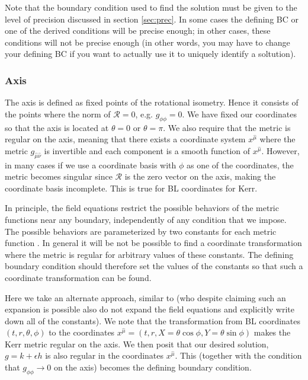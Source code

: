 \documentclass[aps,prd,amsmath,showpacs,amssymb,superscriptaddress,nofootinbib,longbibliography,eqsecnum,preprintnumbers]{revtex4-1}
\begin{document}
Note that the boundary condition used to find the solution must be given to the level of precision discussed in section \ref{sec:prec}. In some cases the defining BC or one of the derived conditions will be precise enough; in other cases, these conditions will not be precise enough (in other words, you may have to change your defining BC if you want to actually use it to uniquely identify a soltution).


\subsubsection{Axis}

The axis is defined as fixed points of the rotational isometry. Hence it consists of the points where the norm of $\mathcal{R}=0$, e.g. $g_{\phi\phi}=0$. We have fixed our coordinates so that the axis is located at $\theta =0$ or $\theta =\pi$. We also require that the metric is regular on the axis, meaning that there exists a coordinate system $x^{\hat \mu}$ where the metric $g_{\hat \mu \hat \nu}$ is invertible and each component is a smooth function of $x^{\hat \mu}$.  However, in many cases if we use a coordinate basis with $\phi$ as one of the coordinates, the metric becomes singular since $\mathcal{R}$ is the zero vector on the axis, making the coordinate basis incomplete. This is true for BL coordinates for Kerr. 

In principle, the field equations restrict the possible behaviors of the metric functions near any boundary, independently of any condition that we impose. The possible behaviors are parameterized by two constants for each metric function \cite{Dias:2015nua}. In general it will be not be possible to find a coordinate transformation where the metric is regular for arbitrary values of these constants. The defining boundary condition should therefore set the values of the constants so that such a coordinate transformation can be found.

Here we take an alternate approach, similar to \cite{Dias:2015nua} (who despite claiming such an expansion is possible also do not expand the field equations and explicitly write down all of the constants). We note that the transformation from BL coordinates $(t,r,\theta, \phi)$ to the coordinates $x^{\hat \mu}=(t, r, X = \theta \cos\phi, Y=\theta \sin\phi)$ makes the Kerr metric regular on the axis. We then posit that our desired solution, $ g = k+\epsilon  h$ is also regular in the coordinates $x^{\hat \mu}$. This (together with the condition that $g_{\phi\phi}\to 0$ on the axis) becomes the defining boundary condition.  
\end{document}
